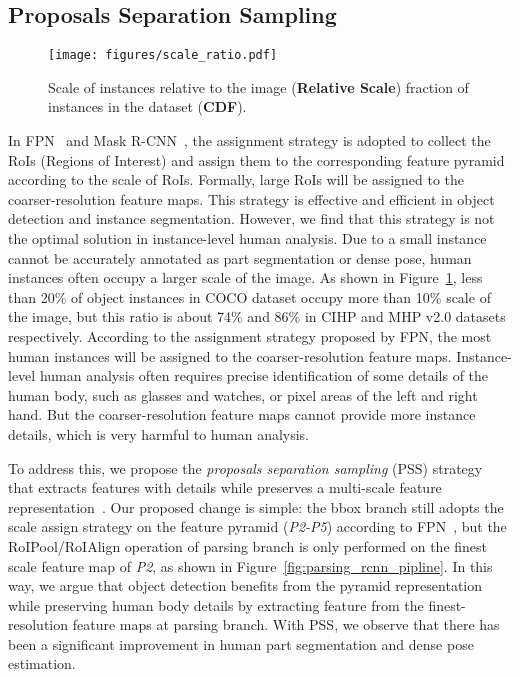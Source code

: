 \documentclass[10pt,twocolumn,letterpaper]{article}
\begin{document}
\subsection{Proposals Separation Sampling}

\begin{figure}[t]
\begin{center}
\texttt{[image: figures/scale\_ratio.pdf]}
\end{center}
\caption{Scale of instances relative to the image (\textbf{Relative Scale})   fraction of instances in the dataset (\textbf{CDF}).}
\label{fig:scale_ratio}
\end{figure}


In FPN~\cite{Lin_cvpr2017_fpn} and Mask R-CNN~\cite{He_iccv2017_maskrcnn}, the assignment strategy is adopted to collect the RoIs (Regions of Interest) and assign them to the corresponding feature pyramid according to the scale of RoIs. Formally, large RoIs will be assigned to the coarser-resolution feature maps. This strategy is effective and efficient in object detection and instance segmentation. However, we find that this strategy is not the optimal solution in instance-level human analysis. Due to a small instance cannot be accurately annotated as part segmentation or dense pose, human instances often occupy a larger scale of the image. As shown in Figure~\ref{fig:scale_ratio}, less than 20\% of object instances in COCO dataset occupy more than 10\% scale of the image, but this ratio is about 74\% and 86\% in CIHP and MHP v2.0 datasets respectively. According to the assignment strategy proposed by FPN, the most human instances will be assigned to the coarser-resolution feature maps. Instance-level human analysis often requires precise identification of some details of the human body, such as glasses and watches, or pixel areas of the left and right hand. But the coarser-resolution feature maps cannot provide more instance details, which is very harmful to human analysis.

To address this, we propose the \emph{proposals separation sampling} (PSS) strategy that extracts features with details while preserves a multi-scale feature representation~\cite{Lin_cvpr2017_fpn, Liu_eccv2016_ssd, Li_arxiv2017_fssd}. Our proposed change is simple: the bbox branch still adopts the scale assign strategy on the feature pyramid (\emph{P2-P5}) according to FPN~\cite{Lin_cvpr2017_fpn}, but the RoIPool/RoIAlign operation of parsing branch is only performed on the finest scale feature map of \emph{P2}, as shown in Figure~\ref{fig:parsing_rcnn_pipline}. In this way, we argue that object detection benefits from the pyramid representation while preserving human body details by extracting feature from the finest-resolution feature maps at parsing branch. With PSS, we observe that there has been a significant improvement in human part segmentation and dense pose estimation.
\end{document}
